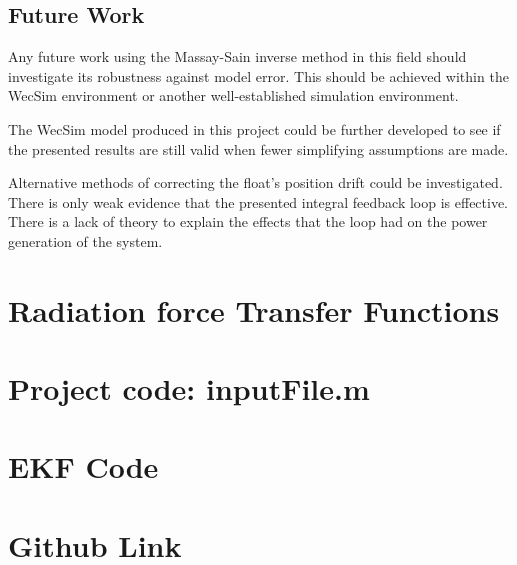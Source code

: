 \documentclass{report}
\begin{document}
\section{Future Work}

Any future work using the Massay-Sain inverse method in this field should investigate its robustness against model error. This should be achieved within the WecSim environment or another well-established simulation environment.

The WecSim model produced in this project could be further developed to see if the presented results are still valid when fewer simplifying assumptions are made.

Alternative methods of correcting the float's position drift could be investigated. There is only weak evidence that the presented integral feedback loop is effective. There is a lack of theory to explain the effects that the loop had on the power generation of the system.





\appendix
\appendixpage
\addappheadtotoc
\chapter{Radiation force Transfer Functions}
\label{radiationTFs}

\chapter{Project code: inputFile.m}
\label{inputFile}

\chapter{EKF Code}
\label{EKFCode}

\chapter{Github Link}
\label{github}
\end{document}
